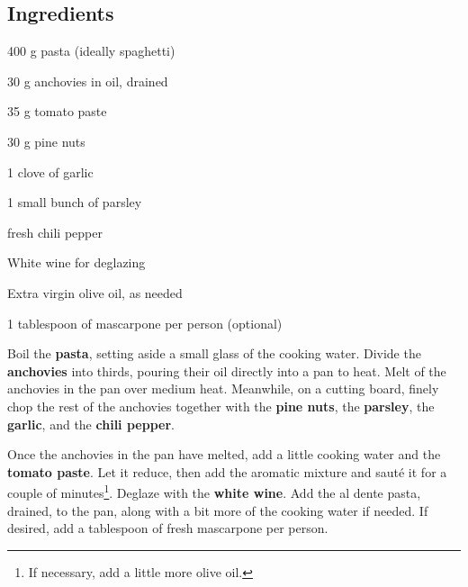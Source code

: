 \newpage
{}

\subsection*{Ingredients}
\begin{ingredients}
	\item 400 g pasta (ideally spaghetti)
	\item 30 g anchovies in oil, drained
	\item 35 g tomato paste
	\item 30 g pine nuts
	\item 1 clove of garlic
	\item 1 small bunch of parsley
	\item {} fresh chili pepper
	\item White wine for deglazing
	\item Extra virgin olive oil, as needed
	\item 1 tablespoon of mascarpone per person (optional)
\end{ingredients}

Boil the \textbf{pasta}, setting aside a small glass of the cooking water.
Divide the \textbf{anchovies} into thirds, pouring their oil directly into a pan to heat. 
Melt  of the anchovies in the pan over medium heat. 
Meanwhile, on a cutting board, finely chop the rest of the anchovies together with the \textbf{pine nuts}, the \textbf{parsley}, the \textbf{garlic}, and the \textbf{chili pepper}.

Once the anchovies in the pan have melted, add a little cooking water and the \textbf{tomato paste}.
Let it reduce, then add the aromatic mixture and sauté it for a couple of minutes\footnote{If necessary, add a little more olive oil.}. 
Deglaze with the \textbf{white wine}. 
Add the al dente pasta, drained, to the pan, along with a bit more of the cooking water if needed. 
If desired, add a tablespoon of fresh mascarpone per person. 

